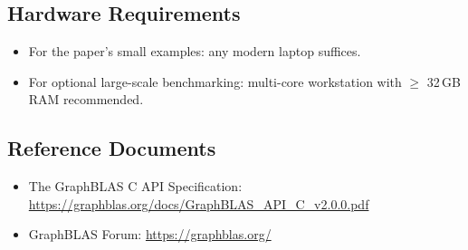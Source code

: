 \documentclass[11pt,a4paper]{article}
\begin{document}
\subsection{Hardware Requirements}
\begin{itemize}
  \item For the paper's small examples: any modern laptop suffices.
  \item For optional large-scale benchmarking: multi-core workstation with $\geq$ 32\,GB RAM recommended.
\end{itemize}

\subsection{Reference Documents}
\begin{itemize}
  \item The GraphBLAS C API Specification: \url{https://graphblas.org/docs/GraphBLAS_API_C_v2.0.0.pdf}
  \item GraphBLAS Forum: \url{https://graphblas.org/}
\end{itemize}
\end{document}
